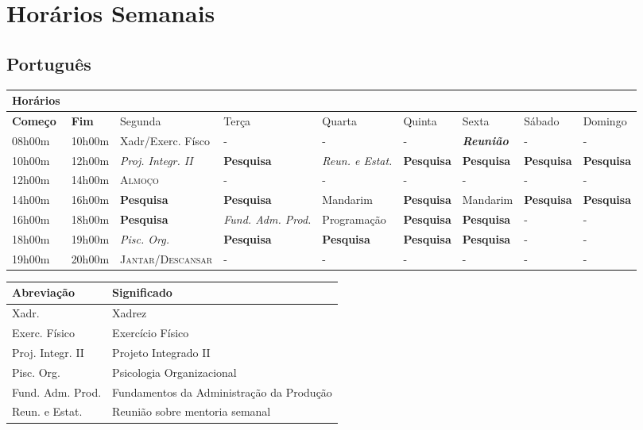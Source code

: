 \documentclass[11pt]{article}
\date{\today}
\title{}
\begin{document}
\tableofcontents


\section{Horários Semanais}
\label{sec:orgdeeaf57}
\subsection{Português}
\label{sec:orgf3fa167}
\large
\begin{center}
\begin{tabular}{lllllllll}
\hline
Horários &  &  &  &  &  &  &  & \\
\hline
\textbf{Começo} & \textbf{Fim} & Segunda & Terça & Quarta & Quinta & Sexta & Sábado & Domingo\\
\hline
08h00m & 10h00m & Xadr/Exerc. Físco & - & - & - & \textbf{\emph{Reunião}} & - & -\\
10h00m & 12h00m & \emph{Proj. Integr. II} & \textbf{Pesquisa} & \emph{Reun. e Estat.} & \textbf{Pesquisa} & \textbf{Pesquisa} & \textbf{Pesquisa} & \textbf{Pesquisa}\\
\hline
12h00m & 14h00m & \textsc{Almoço} & - & - & - & - & - & -\\
14h00m & 16h00m & \textbf{Pesquisa} & \textbf{Pesquisa} & Mandarim & \textbf{Pesquisa} & Mandarim & \textbf{Pesquisa} & \textbf{Pesquisa}\\
\hline
16h00m & 18h00m & \textbf{Pesquisa} & \emph{Fund. Adm. Prod.} & Programação & \textbf{Pesquisa} & \textbf{Pesquisa} & - & -\\
18h00m & 19h00m & \emph{Pisc. Org.} & \textbf{Pesquisa} & \textbf{Pesquisa} & \textbf{Pesquisa} & \textbf{Pesquisa} & - & -\\
19h00m & 20h00m & \textsc{Jantar/Descansar} & - & - & - & - & - & -\\
\hline
\end{tabular}
\end{center}
\vspace{5mm}
\begin{center}
\begin{tabular}{ll}
Abreviação & Significado\\
\hline
Xadr. & Xadrez\\
Exerc. Físico & Exercício Físico\\
Proj. Integr. II & Projeto Integrado II\\
Pisc. Org. & Psicologia Organizacional\\
Fund. Adm. Prod. & Fundamentos da Administração da Produção\\
Reun. e Estat. & Reunião sobre mentoria semanal\\
\hline
\end{tabular}
\end{center}
\end{document}
